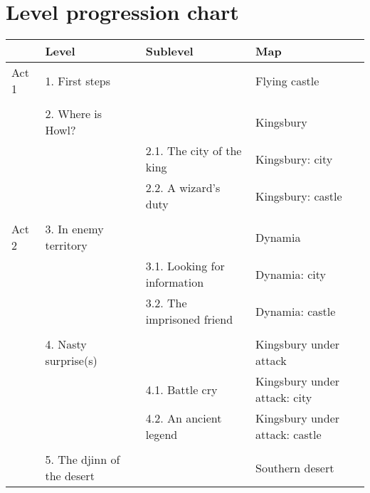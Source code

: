 \section{Level progression chart}

\begin{longtable}[H]{|p{2cm}|p{3cm}|p{3cm}|p{3cm}|}
\hline
\rowcolor[HTML]{C0C0C0} 
\multicolumn{1}{|l|}{\cellcolor[HTML]{C0C0C0}\textbf{Story act}} & \multicolumn{1}{l|}{\cellcolor[HTML]{C0C0C0}\textbf{Level}} & \multicolumn{1}{l|}{\cellcolor[HTML]{C0C0C0}\textbf{Sublevel}} & \textbf{Map} \\ \hline
\multicolumn{1}{|l|}{\cellcolor[HTML]{C0C0C0}Act 1} & \multicolumn{1}{l|}{1. First steps} & \multicolumn{1}{l|}{} & Flying castle \\ \hline
\multicolumn{1}{|l|}{} & \multicolumn{3}{l|}{} \\ \cline{2-4} 
 & \multicolumn{1}{l|}{2. Where is Howl?} & \multicolumn{1}{l|}{} & Kingsbury \\ \cline{2-4} 
 & \multicolumn{1}{l|}{} & \multicolumn{1}{l|}{2.1. The city of the king} & Kingsbury: city \\ \cline{3-4} 
 & \multicolumn{1}{l|}{} & \multicolumn{1}{l|}{2.2. A wizard's duty} & Kingsbury: castle \\ \hline
\multicolumn{4}{|l|}{} \\ \hline
\multicolumn{1}{|l|}{\cellcolor[HTML]{C0C0C0}Act 2} & \multicolumn{1}{l|}{3. In enemy territory} & \multicolumn{1}{l|}{} & Dynamia \\ \hline
 & \multicolumn{1}{l|}{} & \multicolumn{1}{l|}{3.1. Looking for information} & Dynamia: city \\ \cline{3-4} 
 & \multicolumn{1}{l|}{} & \multicolumn{1}{l|}{3.2. The imprisoned friend} & Dynamia: castle \\ \cline{2-4} 
 &  \multicolumn{3}{l|}{}  \\ \cline{2-4} 
 & \multicolumn{1}{l|}{4. Nasty surprise(s)} & \multicolumn{1}{l|}{} & Kingsbury under attack \\ \cline{2-4} 
 & \multicolumn{1}{l|}{} & \multicolumn{1}{l|}{4.1. Battle cry} & Kingsbury under attack: city \\ \cline{3-4} 
 & \multicolumn{1}{l|}{} & \multicolumn{1}{l|}{4.2. An ancient legend} & Kingsbury under attack: castle \\ \cline{2-4} 
 & \multicolumn{3}{l|}{} \\ \cline{2-4} 
 & \multicolumn{1}{l|}{5. The djinn of the desert} & \multicolumn{1}{l|}{} & Southern desert \\ \cline{2-4} 

\end{longtable}
